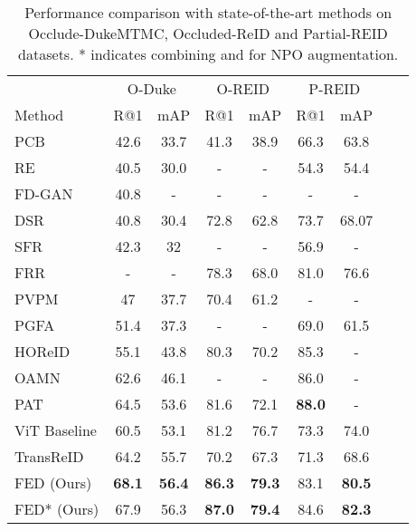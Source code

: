 \documentclass[10pt,twocolumn,letterpaper]{article}
\begin{document}
\begin{table}[t]
	\centering
	\small
\setlength\tabcolsep{1pt}
	\begin{tabular}{ccccccccc}
	    \toprule
		\multicolumn{1}{c}{} & \multicolumn{2}{c}{O-Duke} & \multicolumn{2}{c}{O-REID} & \multicolumn{2}{c}{P-REID} \\
		\multicolumn{1}{l}{Method} & R@1 & mAP & R@1 & mAP & R@1 & mAP \\
		\hline
		\multicolumn{1}{l}{PCB \cite{sun2018beyond}} & 42.6 & 33.7 & 41.3 & 38.9 & 66.3 & 63.8 \\
		\multicolumn{1}{l}{RE \cite{zhong2020random}} & 40.5 & 30.0 & - & - & 54.3 & 54.4 \\
		\multicolumn{1}{l}{FD-GAN \cite{ge2018fd}} & 40.8 & - & - & - & - & - \\
		\multicolumn{1}{l}{DSR \cite{he2018deep}} & 40.8 & 30.4 & 72.8 & 62.8 & 73.7 & 68.07 \\
		\multicolumn{1}{l}{SFR \cite{he2018recognizing}} & 42.3 & 32 & - & - & 56.9 & - \\
		\multicolumn{1}{l}{FRR \cite{he2019foreground}} & - & - & 78.3 & 68.0 & 81.0 & 76.6 \\
		\multicolumn{1}{l}{PVPM \cite{gao2020pose}} & 47 & 37.7 & 70.4 & 61.2 & - & - \\
		\multicolumn{1}{l}{PGFA \cite{miao2019pose}} & 51.4 & 37.3 & - & - & 69.0 & 61.5 \\
		\multicolumn{1}{l}{HOReID \cite{wang2020high}} & 55.1 & 43.8 & 80.3 & 70.2 & 85.3 & - \\
		\multicolumn{1}{l}{OAMN \cite{chen2021occlude}} & 62.6 & 46.1 & - & - & 86.0 & - \\
		\multicolumn{1}{l}{PAT \cite{li2021diverse}} & 64.5 & 53.6 & 81.6 & 72.1 & \textbf{88.0} & - \\
		\hline
		\multicolumn{1}{l}{ViT Baseline \cite{he2021transreid}} & 60.5 & 53.1 & 81.2 & 76.7 & 73.3 & 74.0 \\
		\multicolumn{1}{l}{TransReID \cite{he2021transreid}} & 64.2 & 55.7 & 70.2 & 67.3 & 71.3 & 68.6 \\
		\hline
		\multicolumn{1}{l}{FED (Ours)} & \textbf{68.1} & \textbf{56.4} & \textbf{86.3} & \textbf{79.3} & 83.1 & \textbf{80.5}\\
		\multicolumn{1}{l}{FED* (Ours)} & 67.9 & 56.3 & \textbf{87.0} & \textbf{79.4} & 84.6 & \textbf{82.3}\\
		\bottomrule
	\end{tabular}
\caption{Performance comparison with state-of-the-art methods on Occlude-DukeMTMC, Occluded-ReID and Partial-REID datasets. * indicates combining  and  for NPO augmentation. 
	}
	\label{occluded}
\end{table}
\end{document}
